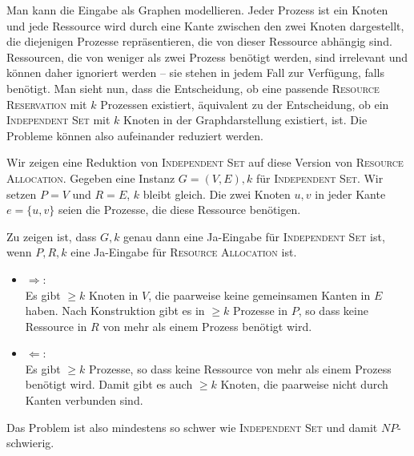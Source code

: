 \documentclass[a4paper]{scrartcl}
\begin{document}
\begin{enumerate}[label=\bfseries \arabic*.]
\begin{enumerate}
        Man kann die Eingabe als Graphen modellieren.
        Jeder Prozess ist ein Knoten und jede Ressource wird durch eine Kante
        zwischen den zwei Knoten dargestellt, die diejenigen Prozesse
        repräsentieren, die von dieser Ressource abhängig sind.
        Ressourcen, die von weniger als zwei Prozess benötigt werden, sind
        irrelevant und können daher ignoriert werden -- sie stehen in jedem
        Fall zur Verfügung, falls benötigt.
        Man sieht nun, dass die Entscheidung, ob eine passende \textsc{Resource
        Reservation} mit $k$ Prozessen existiert, äquivalent zu der
        Entscheidung, ob ein \textsc{Independent Set} mit $k$ Knoten in der
        Graphdarstellung existiert, ist.
        Die Probleme können also aufeinander reduziert werden.

        Wir zeigen eine Reduktion von \textsc{Independent Set} auf diese
        Version von \textsc{Resource Allocation}.
        Gegeben eine Instanz $G = (V,E), k$ für \textsc{Independent Set}.
        Wir setzen $P = V$ und $R = E$, $k$ bleibt gleich.
        Die zwei Knoten $u,v$ in jeder Kante $e = \{u,v\}$ seien die Prozesse,
        die diese Ressource benötigen.

        Zu zeigen ist, dass $G,k$ genau dann eine Ja-Eingabe für
        \textsc{Independent Set} ist, wenn $P,R,k$ eine Ja-Eingabe für
        \textsc{Resource Allocation} ist.
        \begin{itemize}
            \item $\Rightarrow$: \\
                Es gibt $\geq k$ Knoten in $V$, die paarweise keine gemeinsamen
                Kanten in $E$ haben.
                Nach Konstruktion gibt es in $\geq k$ Prozesse in $P$, so dass
                keine Ressource in $R$ von mehr als einem Prozess benötigt
                wird.
            \item $\Leftarrow$: \\
                Es gibt $\geq k$ Prozesse, so dass keine Ressource von mehr als
                einem Prozess benötigt wird.
                Damit gibt es auch $\geq k$ Knoten, die paarweise nicht durch
                Kanten verbunden sind.
        \end{itemize}
        Das Problem ist also mindestens so schwer wie \textsc{Independent Set}
        und damit $NP$-schwierig.

\end{enumerate}


\end{enumerate}
\end{document}
